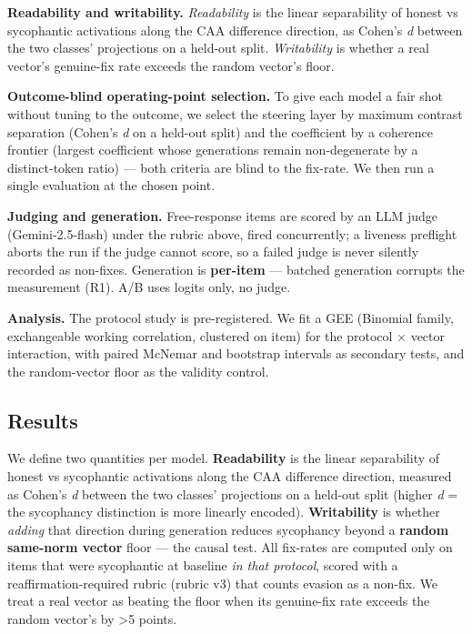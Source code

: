 \documentclass[11pt]{article}
\begin{document}
\textbf{Readability and writability.} \emph{Readability} is the linear separability of honest vs sycophantic
activations along the CAA difference direction, as Cohen's \emph{d} between the two classes' projections on
a held-out split. \emph{Writability} is whether a real vector's genuine-fix rate exceeds the random
vector's floor.

\textbf{Outcome-blind operating-point selection.} To give each model a fair shot without tuning to the
outcome, we select the steering layer by maximum contrast separation (Cohen's \emph{d} on a held-out
split) and the coefficient by a coherence frontier (largest coefficient whose generations remain
non-degenerate by a distinct-token ratio) --- both criteria are blind to the fix-rate. We then run a
single evaluation at the chosen point.

\textbf{Judging and generation.} Free-response items are scored by an LLM judge (Gemini-2.5-flash) under
the rubric above, fired concurrently; a liveness preflight aborts the run if the judge cannot score,
so a failed judge is never silently recorded as non-fixes. Generation is \textbf{per-item} --- batched
generation corrupts the measurement (R1). A/B uses logits only, no judge.

\textbf{Analysis.} The protocol study is pre-registered. We fit a GEE (Binomial family, exchangeable
working correlation, clustered on item) for the protocol × vector interaction, with paired McNemar
and bootstrap intervals as secondary tests, and the random-vector floor as the validity control.

\subsection{Results}\label{results}

We define two quantities per model. \textbf{Readability} is the linear separability of honest vs
sycophantic activations along the CAA difference direction, measured as Cohen's \emph{d} between the two
classes' projections on a held-out split (higher \emph{d} = the sycophancy distinction is more linearly
encoded). \textbf{Writability} is whether \emph{adding} that direction during generation reduces sycophancy
beyond a \textbf{random same-norm vector} floor --- the causal test. All fix-rates are computed only on
items that were sycophantic at baseline \emph{in that protocol}, scored with a reaffirmation-required
rubric (rubric v3) that counts evasion as a non-fix. We treat a real vector as beating the floor when
its genuine-fix rate exceeds the random vector's by \textgreater5 points.
\end{document}
